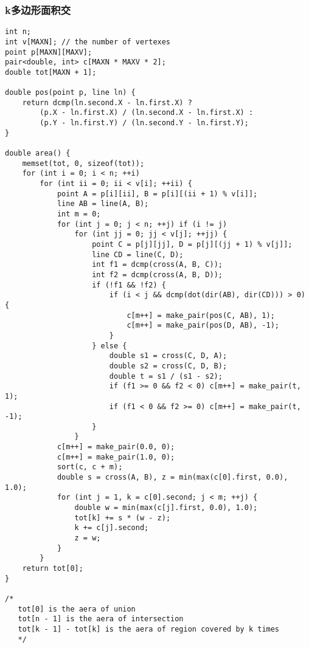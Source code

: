 \subsubsection{k多边形面积交}
\begin{verbatim}
int n;
int v[MAXN]; // the number of vertexes
point p[MAXN][MAXV];
pair<double, int> c[MAXN * MAXV * 2];
double tot[MAXN + 1];

double pos(point p, line ln) {
    return dcmp(ln.second.X - ln.first.X) ?
        (p.X - ln.first.X) / (ln.second.X - ln.first.X) :
        (p.Y - ln.first.Y) / (ln.second.Y - ln.first.Y);
}

double area() {
    memset(tot, 0, sizeof(tot));
    for (int i = 0; i < n; ++i)
        for (int ii = 0; ii < v[i]; ++ii) {
            point A = p[i][ii], B = p[i][(ii + 1) % v[i]];
            line AB = line(A, B);
            int m = 0;
            for (int j = 0; j < n; ++j) if (i != j)
                for (int jj = 0; jj < v[j]; ++jj) {
                    point C = p[j][jj], D = p[j][(jj + 1) % v[j]];
                    line CD = line(C, D);
                    int f1 = dcmp(cross(A, B, C));
                    int f2 = dcmp(cross(A, B, D));
                    if (!f1 && !f2) {
                        if (i < j && dcmp(dot(dir(AB), dir(CD))) > 0) {
                            c[m++] = make_pair(pos(C, AB), 1);
                            c[m++] = make_pair(pos(D, AB), -1);
                        }
                    } else {
                        double s1 = cross(C, D, A);
                        double s2 = cross(C, D, B);
                        double t = s1 / (s1 - s2);
                        if (f1 >= 0 && f2 < 0) c[m++] = make_pair(t, 1);
                        if (f1 < 0 && f2 >= 0) c[m++] = make_pair(t, -1);
                    }
                }
            c[m++] = make_pair(0.0, 0);
            c[m++] = make_pair(1.0, 0);
            sort(c, c + m);
            double s = cross(A, B), z = min(max(c[0].first, 0.0), 1.0);
            for (int j = 1, k = c[0].second; j < m; ++j) {
                double w = min(max(c[j].first, 0.0), 1.0);
                tot[k] += s * (w - z);
                k += c[j].second;
                z = w;
            }
        }
    return tot[0];
}

/*
   tot[0] is the aera of union
   tot[n - 1] is the aera of intersection
   tot[k - 1] - tot[k] is the aera of region covered by k times
   */
\end{verbatim}
